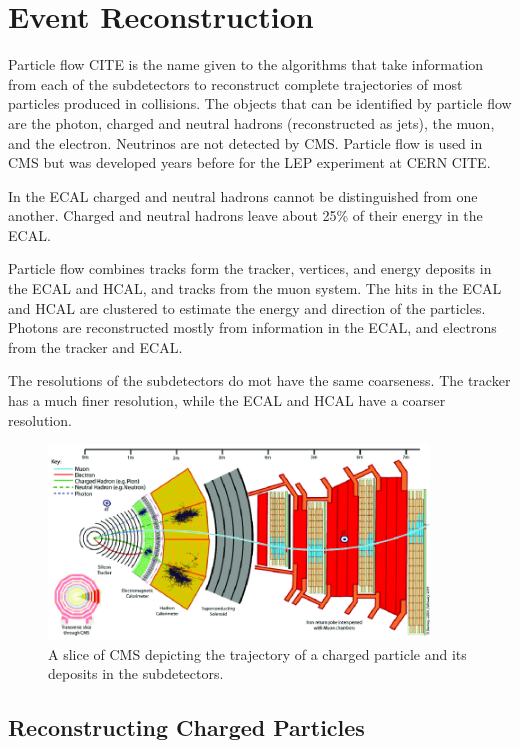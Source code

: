 \chapter{Event Reconstruction}\label{chap:pflow}




Particle flow CITE is the name given to the algorithms that take information from each of the subdetectors to reconstruct complete trajectories of most particles produced in collisions. The objects that can be identified by particle flow are the photon, charged and neutral hadrons (reconstructed as jets), the muon, and the electron. Neutrinos are not detected by CMS. Particle flow is used in CMS but was developed years before for the LEP experiment at CERN CITE.

In the ECAL charged and neutral hadrons cannot be distinguished from one another. Charged and neutral hadrons leave about 25\% of their energy in the ECAL.


Particle flow combines tracks form the tracker, vertices, and energy deposits in the ECAL and HCAL, and tracks from the muon system. The hits in the ECAL and HCAL are clustered to estimate the energy and direction of the particles. Photons are reconstructed mostly from information in the ECAL, and electrons from the tracker and ECAL. 

The resolutions of the subdetectors do mot have the same coarseness. The tracker has a much finer resolution, while the ECAL and HCAL have a coarser resolution.

 \begin{figure}[h]
\centering
\includegraphics[width=0.9\textwidth]{figures/cms_slice}
\caption{A slice of CMS depicting the trajectory of a charged particle and its deposits in the subdetectors.}
\label{fig:cms_slice}
\end{figure}

\section{Reconstructing Charged Particles}


